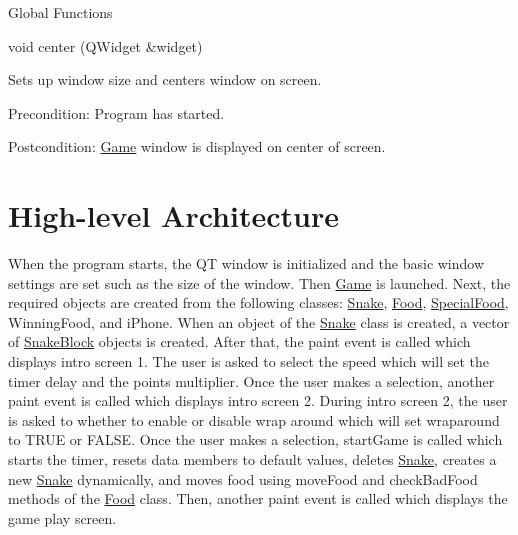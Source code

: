 \begin{DoxyItemize}
\item \-Global \-Functions
\begin{DoxyItemize}
\item void center (\-Q\-Widget \&widget)
\begin{DoxyItemize}
\item \-Sets up window size and centers window on screen.
\item \-Precondition\-: \-Program has started.
\item \-Postcondition\-: \hyperlink{classGame}{\-Game} window is displayed on center of screen.
\end{DoxyItemize}
\end{DoxyItemize}
\end{DoxyItemize}



 \hypertarget{index_High-level_Architecture}{}\section{\-High-\/level Architecture}\label{index_High-level_Architecture}
\-When the program starts, the \-Q\-T window is initialized and the basic window settings are set such as the size of the window. \-Then \hyperlink{classGame}{\-Game} is launched. \-Next, the required objects are created from the following classes\-: \hyperlink{classSnake}{\-Snake}, \hyperlink{classFood}{\-Food}, \hyperlink{classSpecialFood}{\-Special\-Food}, \-Winning\-Food, and i\-Phone. \-When an object of the \hyperlink{classSnake}{\-Snake} class is created, a vector of \hyperlink{classSnakeBlock}{\-Snake\-Block} objects is created. \-After that, the paint event is called which displays intro screen 1. \-The user is asked to select the speed which will set the timer delay and the points multiplier. \-Once the user makes a selection, another paint event is called which displays intro screen 2. \-During intro screen 2, the user is asked to whether to enable or disable wrap around which will set wraparound to \-T\-R\-U\-E or \-F\-A\-L\-S\-E. \-Once the user makes a selection, start\-Game is called which starts the timer, resets data members to default values, deletes \hyperlink{classSnake}{\-Snake}, creates a new \hyperlink{classSnake}{\-Snake} dynamically, and moves food using move\-Food and check\-Bad\-Food methods of the \hyperlink{classFood}{\-Food} class. \-Then, another paint event is called which displays the game play screen. 

